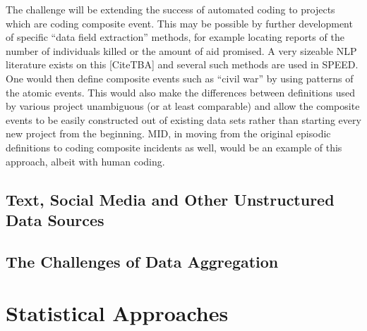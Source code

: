\documentclass[graybox]{svmult}
\begin{document}
The challenge will be extending the success of automated coding to projects which are coding composite event. This may be possible by further development of specific ``data field extraction'' methods, for example locating reports of the number of individuals killed or the amount of aid promised. A very sizeable NLP literature exists on this [CiteTBA] and several such methods are used in SPEED. %
One would then define composite events such as ``civil war'' by using patterns of the atomic events. %
This would also make the differences between definitions used by various project unambiguous (or at least comparable) and  allow the composite events to be easily constructed out of existing data sets rather than starting every new project from the beginning. MID, in moving from the original episodic definitions to coding composite incidents as well, would be an example of this approach, albeit with human coding.


\subsection{Text, Social Media and Other Unstructured Data Sources}
\label{subsec:socialmedia}

\subsection{The Challenges of Data Aggregation}
\label{subsec:aggregation}


\section{Statistical Approaches}
\label{sec:logit}
\end{document}
